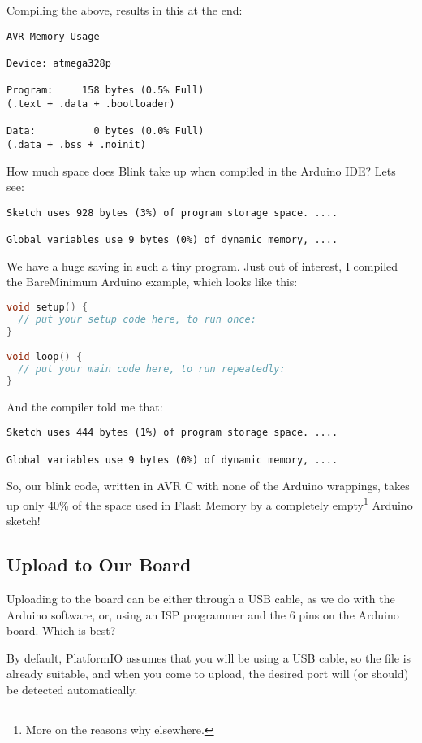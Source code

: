 Compiling the above, results in this at the end:

\begin{lstlisting}[firstnumber=14]
AVR Memory Usage
----------------
Device: atmega328p
 
Program:     158 bytes (0.5% Full)
(.text + .data + .bootloader)
 
Data:          0 bytes (0.0% Full)
(.data + .bss + .noinit)
\end{lstlisting}

How much space does Blink take up when compiled in the Arduino IDE? Lets see:

\begin{lstlisting}
Sketch uses 928 bytes (3%) of program storage space. ....

Global variables use 9 bytes (0%) of dynamic memory, ....
\end{lstlisting}

We have a huge saving in such a tiny program. Just out of interest, I compiled the BareMinimum Arduino example, which looks like this:

\begin{lstlisting}[language=C]
void setup() {
  // put your setup code here, to run once:
}

void loop() {
  // put your main code here, to run repeatedly:
}
\end{lstlisting}

And the compiler told me that:

\begin{lstlisting}
Sketch uses 444 bytes (1%) of program storage space. ....

Global variables use 9 bytes (0%) of dynamic memory, ....
\end{lstlisting}

So, our blink code, written in AVR C with none of the Arduino wrappings,
takes up only 40\% of the space used in Flash Memory by a completely
empty\footnote{More on the reasons why elsewhere.} Arduino sketch!

\subsection{Upload to Our Board}\label{upload-to-our-board}

Uploading to the board can be either through a USB cable, as we do with the Arduino software, or, using an ISP programmer and the 6 pins on the Arduino board. Which is best?

By default, PlatformIO assumes that you will be using a USB cable, so the file  is already suitable, and when you come to upload, the desired port will (or should) be detected automatically.

